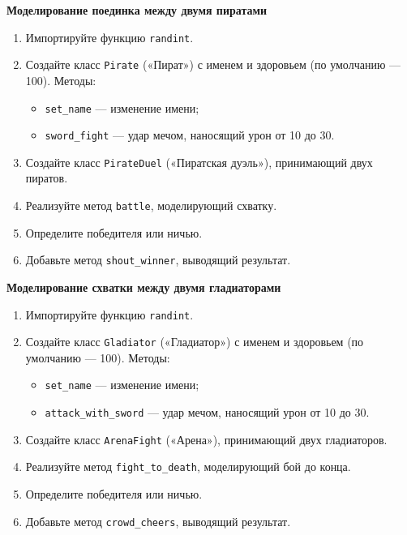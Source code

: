 \item \textbf{Моделирование поединка между двумя пиратами}

\begin{enumerate}
    \item Импортируйте функцию \texttt{randint}.

    \item Создайте класс \texttt{Pirate} («Пират») с именем и здоровьем (по умолчанию — 100).  
    Методы:
    \begin{itemize}
        \item \texttt{set\_name} — изменение имени;
        \item \texttt{sword\_fight} — удар мечом, наносящий урон от 10 до 30.
    \end{itemize}

    \item Создайте класс \texttt{PirateDuel} («Пиратская дуэль»), принимающий двух пиратов.

    \item Реализуйте метод \texttt{battle}, моделирующий схватку.

    \item Определите победителя или ничью.

    \item Добавьте метод \texttt{shout\_winner}, выводящий результат.
\end{enumerate}

\item \textbf{Моделирование схватки между двумя гладиаторами}

\begin{enumerate}
    \item Импортируйте функцию \texttt{randint}.

    \item Создайте класс \texttt{Gladiator} («Гладиатор») с именем и здоровьем (по умолчанию — 100).  
    Методы:
    \begin{itemize}
        \item \texttt{set\_name} — изменение имени;
        \item \texttt{attack\_with\_sword} — удар мечом, наносящий урон от 10 до 30.
    \end{itemize}

    \item Создайте класс \texttt{ArenaFight} («Арена»), принимающий двух гладиаторов.

    \item Реализуйте метод \texttt{fight\_to\_death}, моделирующий бой до конца.

    \item Определите победителя или ничью.

    \item Добавьте метод \texttt{crowd\_cheers}, выводящий результат.
\end{enumerate}

